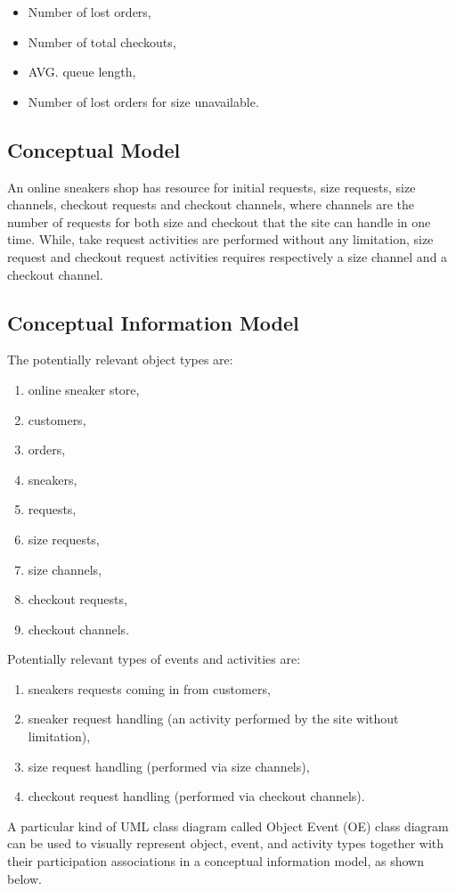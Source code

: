 \documentclass{article}
\begin{document}
\begin{itemize}
\item Number of lost orders,
\item Number of total checkouts,
\item AVG. queue length,
\item Number of lost orders for size unavailable.
\end{itemize}

\subsection{Conceptual Model}
An online sneakers shop has resource for initial requests, size requests, size channels, checkout requests and checkout channels, where channels are the number of requests for both size and checkout that the site can handle in one time. While, take request activities are performed without any limitation, size request and checkout request activities requires respectively a size channel and a checkout channel.

\subsection{Conceptual Information Model}
The potentially relevant object types are:
\begin{enumerate}
\item online sneaker store,
\item customers,
\item orders,
\item sneakers,
\item requests,
\item size requests,
\item size channels,
\item checkout requests,
\item checkout channels.
\end{enumerate}
Potentially relevant types of events and activities are:
\begin{enumerate}
\item sneakers requests coming in from customers,
\item sneaker request handling (an activity performed by the site without limitation),
\item size request handling (performed via size channels),
\item checkout request handling (performed via checkout channels).
\end{enumerate}
A particular kind of UML class diagram called Object Event (OE) class diagram can be used to visually represent object, event, and activity types together with their participation associations in a conceptual information model, as shown below.
\end{document}
